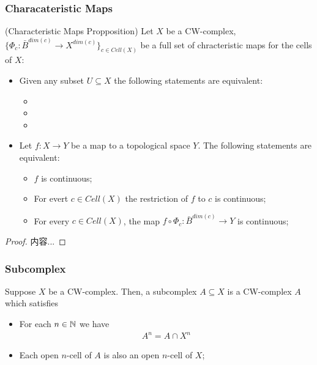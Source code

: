 \documentclass[Total.tex]{subfiles}
\begin{document}
		\subsubsection{Characateristic Maps}
			\begin{proposition}
				(Characteristic Maps Propposition) Let $X$ be a CW-complex, $\{\Phi_c:\bar{B}^{dim(c)}\rightarrow X^{dim(c)}\}_{c\in Cell(X)}$ be a full set of chracteristic maps for the cells of $X$:
				\begin{itemize}
					\item Given any subset $U\subseteq X$ the following statements are equivalent:
					\begin{itemize}
						\item 
						\item 
						\item 
					\end{itemize}
					\item Let $f:X\rightarrow Y$ be a map to a topological space $Y$. The following statements are equivalent:
					\begin{itemize}
						\item $f$ is continuous;
						\item For evert $c\in Cell(X)$ the restriction of $f$ to $c$ is continuous;
						\item For every $c\in Cell(X)$, the map $f\circ \Phi_c:\bar{B}^{dim(c)}\rightarrow Y$ is continuous; 
					\end{itemize}
				\end{itemize}
			\end{proposition}
			\begin{proof}
				内容...
			\end{proof}
		\subsubsection{Subcomplex}
		\begin{Def}
			Suppose $X$ be a CW-complex. Then, a subcomplex $A\subseteq X$ is a CW-complex $A$ which satisfies
			\begin{itemize}
				\item For each $n\in \mathbb{N}$ we have
				\begin{gather*}
					A^n=A\cap X^n
				\end{gather*}
				\item Each open $n$-cell of $A$ is also an open $n$-cell of $X$;
			\end{itemize}
		\end{Def}
		
\end{document}
